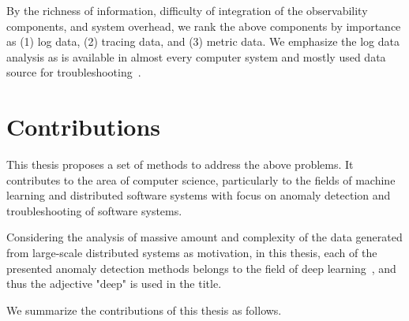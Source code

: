 By the richness of information, difficulty of integration of the observability components, and system overhead, we rank the above components by importance as (1) log data, (2) tracing data, and (3) metric data. We emphasize the log data analysis as is available in almost every computer system and mostly used data source for troubleshooting~\cite{zhu2019tools}. 

\section{Contributions}\label{ch:introduction:sec:contributions}
This thesis proposes a set of methods to address the above problems. It contributes to the  area of computer science, particularly to the fields of machine learning and distributed software systems with focus on anomaly detection and troubleshooting of software systems.

Considering the analysis of massive amount and complexity of the data generated from large-scale distributed systems as motivation, in this thesis, each of the presented anomaly detection methods belongs to the field of deep learning~\cite{hinton2006reducing,Goodfellow-et-al-2016}, and thus the adjective "deep" is used in the title.

\newpage

We summarize the contributions of this thesis as follows.

